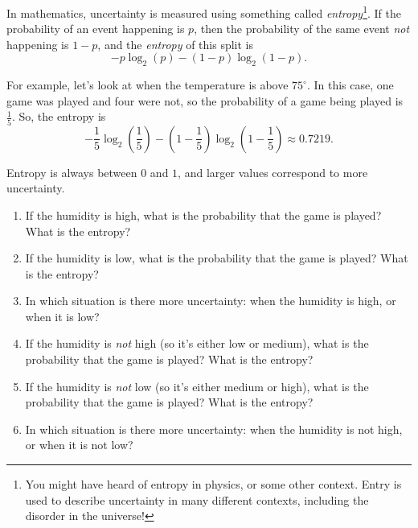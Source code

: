 \documentclass[10pt]{article}
\begin{document}
\newpage

In mathematics, uncertainty is measured using something called \emph{entropy}\footnote{You might have heard of entropy in physics, or some other context. Entry is used to describe uncertainty in many different contexts, including the disorder in the universe!}. If the probability of an event happening is $p$, then the probability of the same event \emph{not} happening is $1-p$, and the \emph{entropy} of this split is
\[
-p\log_2(p) - (1-p)\log_2(1-p).
\]

For example, let's look at when the temperature is above $75^\circ$. In this case, one game was played and four were not, so the probability of a game being played is $\frac{1}{5}$. So, the entropy is
\[
-\frac{1}{5}\log_2\left(\frac{1}{5}\right) - \left(1-\frac{1}{5}\right)\log_2\left(1 - \frac{1}{5}\right)\approx 0.7219.
\]

Entropy is always between $0$ and $1$, and larger values correspond to more uncertainty.


\begin{enumerate}
\item If the humidity is high, what is the probability that the game is played? What is the entropy?
\vspace{2cm}

\item If the humidity is low, what is the probability that the game is played? What is the entropy?
\vspace{2cm}

\item In which situation is there more uncertainty: when the humidity is high, or when it is low?
\vfill

\item If the humidity is \emph{not} high (so it's either low or medium), what is the probability that the game is played? What is the entropy?
\vspace{2cm}

\item If the humidity is \emph{not} low (so it's either medium or high), what is the probability that the game is played? What is the entropy?
\vspace{2cm}

\item In which situation is there more uncertainty: when the humidity is not high, or when it is not low?
\vfill
\end{enumerate}

\newpage
\end{document}
